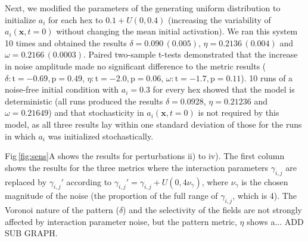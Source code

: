 \documentclass[9pt,lineno]{elife}
\newcommand{\sensitivity}[1]{\textcolor{revgblack}{#1}}
\newcommand{\mb}[1]{\mathbf{#1}}
\begin{document}
\sensitivity{Next, we modified the parameters of the generating uniform distribution
  to initialize $a_i$ for each hex to $0.1+{U}(0,0.4)$ (increasing the variability of
  $a_i(\mb{x},t=0)$ without changing the mean initial activation). We ran this
  system 10 times and obtained the results $\delta=0.090\,(0.005)$,
  $\eta=0.2136\,(0.004)$ and $\omega=0.2166\,(0.0003)$. Paired two-sample t-tests
  demonstrated that the increase in noise amplitude made no significant
  difference to the metric results ($\delta:
  \mathrm{t}=-0.69,\mathrm{p}=0.49$,
  $\eta: \mathrm{t}=-2.0,\mathrm{p}=0.06$,
  $\omega: \mathrm{t}=-1.7,\mathrm{p}=0.11$). 10 runs of a
  noise-free initial condition with $a_i=0.3$ for every hex showed that
  the model is deterministic (all runs produced the results $\delta=0.0928$,
  $\eta=0.21236$ and $\omega=0.21649$) and that stochasticity in
  $a_i(\mb{x},t=0)$ is not required by this model, as all three results lay within
  one standard deviation of those for the runs in which $a_i$ was initialized stochastically.}


\sensitivity{Fig\,\ref{fig:sens}A shows the results for perturbations ii) to iv). The
  first column shows the results for the three metrics where the interaction
  parameters $\gamma_{i,j}$ are replaced by $\gamma_{i,j}'$ according to
  $\gamma_{i,j}' = \gamma_{i,j} + U(0,4\nu_\gamma)$, where $\nu_\gamma$ is the
  chosen magnitude of the noise (the proportion of the full range of
  $\gamma_{i,j}$, which is 4). The Voronoi nature of the pattern ($\delta$)
  and the selectivity of the fields are not strongly affected by interaction
  parameter noise, but the pattern metric, $\eta$ shows a... ADD SUB GRAPH.}
\end{document}
